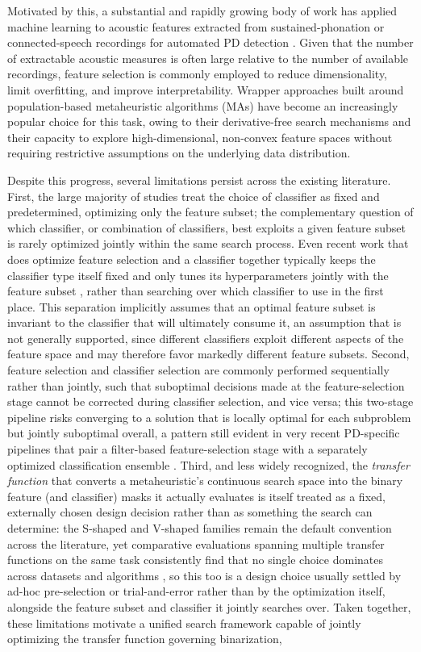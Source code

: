 Motivated by this, a substantial and rapidly growing body of work has applied machine learning to acoustic features extracted from sustained-phonation or connected-speech recordings for automated PD detection \cite{Amato:2023}. Given that the number of extractable acoustic measures is often large relative to the number of available recordings, feature selection is commonly employed to reduce dimensionality, limit overfitting, and improve interpretability. Wrapper approaches built around population-based metaheuristic algorithms (MAs) have become an increasingly popular choice for this task, owing to their derivative-free search mechanisms and their capacity to explore high-dimensional, non-convex feature spaces without requiring restrictive assumptions on the underlying data distribution.

Despite this progress, several limitations persist across the existing literature. First, the large majority of studies treat the choice of classifier as fixed and predetermined, optimizing only the feature subset; the complementary question of which classifier, or combination of classifiers, best exploits a given feature subset is rarely optimized jointly within the same search process. Even recent work that does optimize feature selection and a classifier together typically keeps the classifier type itself fixed and only tunes its hyperparameters jointly with the feature subset \cite{Shukla:2024}, rather than searching over which classifier to use in the first place. This separation implicitly assumes that an optimal feature subset is invariant to the classifier that will ultimately consume it, an assumption that is not generally supported, since different classifiers exploit different aspects of the feature space and may therefore favor markedly different feature subsets. Second, feature selection and classifier selection are commonly performed sequentially rather than jointly, such that suboptimal decisions made at the feature-selection stage cannot be corrected during classifier selection, and vice versa; this two-stage pipeline risks converging to a solution that is locally optimal for each subproblem but jointly suboptimal overall, a pattern still evident in very recent PD-specific pipelines that pair a filter-based feature-selection stage with a separately optimized classification ensemble \cite{Gunduz:2025}. Third, and less widely recognized, the \emph{transfer function} that converts a metaheuristic's continuous search space into the binary feature (and classifier) masks it actually evaluates is itself treated as a fixed, externally chosen design decision rather than as something the search can determine: the S-shaped and V-shaped families remain the default convention across the literature, yet comparative evaluations spanning multiple transfer functions on the same task consistently find that no single choice dominates across datasets and algorithms \cite{Kuntalp:2024}, so this too is a design choice usually settled by ad-hoc pre-selection or trial-and-error rather than by the optimization itself, alongside the feature subset and classifier it jointly searches over. Taken together, these limitations motivate a unified search framework capable of jointly optimizing the transfer function governing binarization, 